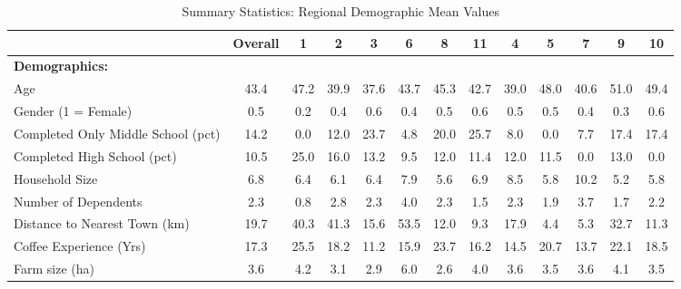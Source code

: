 \begin{table}[htbp]\centering \scriptsize
\def\sym#1{\ifmmode^{#1}\else\(^{#1}\)\fi}
\caption{Summary Statistics: Regional Demographic Mean Values \label{summary_stats}}
\begin{tabular}{l*{12}{c}}
\toprule
                &\multicolumn{1}{c}{Overall}&\multicolumn{1}{c}{1}&\multicolumn{1}{c}{2}&\multicolumn{1}{c}{3}&\multicolumn{1}{c}{6}&\multicolumn{1}{c}{8}&\multicolumn{1}{c}{11}&\multicolumn{1}{c}{4}&\multicolumn{1}{c}{5}&\multicolumn{1}{c}{7}&\multicolumn{1}{c}{9}&\multicolumn{1}{c}{10}\\
\midrule
\textbf{Demographics:}&         &         &         &         &         &         &         &         &         &         &         &         \\
\addlinespace
Age             &     43.4&     47.2&     39.9&     37.6&     43.7&     45.3&     42.7&     39.0&     48.0&     40.6&     51.0&     49.4\\
\addlinespace
Gender (1 = Female)&      0.5&      0.2&      0.4&      0.6&      0.4&      0.5&      0.6&      0.5&      0.5&      0.4&      0.3&      0.6\\
\addlinespace
Completed Only Middle School (pct)&     14.2&      0.0&     12.0&     23.7&      4.8&     20.0&     25.7&      8.0&      0.0&      7.7&     17.4&     17.4\\
\addlinespace
Completed High School (pct)&     10.5&     25.0&     16.0&     13.2&      9.5&     12.0&     11.4&     12.0&     11.5&      0.0&     13.0&      0.0\\
\addlinespace
Household Size  &      6.8&      6.4&      6.1&      6.4&      7.9&      5.6&      6.9&      8.5&      5.8&     10.2&      5.2&      5.8\\
\addlinespace
Number of Dependents&      2.3&      0.8&      2.8&      2.3&      4.0&      2.3&      1.5&      2.3&      1.9&      3.7&      1.7&      2.2\\
\addlinespace
Distance to Nearest Town (km)&     19.7&     40.3&     41.3&     15.6&     53.5&     12.0&      9.3&     17.9&      4.4&      5.3&     32.7&     11.3\\
\addlinespace
Coffee Experience (Yrs)&     17.3&     25.5&     18.2&     11.2&     15.9&     23.7&     16.2&     14.5&     20.7&     13.7&     22.1&     18.5\\
\addlinespace
Farm size (ha)  &      3.6&      4.2&      3.1&      2.9&      6.0&      2.6&      4.0&      3.6&      3.5&      3.6&      4.1&      3.5\\

\end{tabular}
\end{table}

